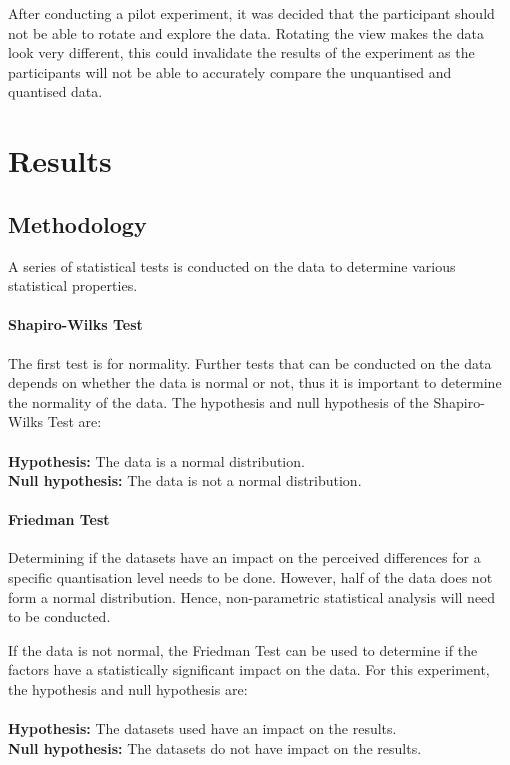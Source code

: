 After conducting a pilot experiment, it was decided that the participant should
not be able to rotate and explore the data. Rotating the view makes the data
look very different, this could invalidate the results of the experiment as the
participants will not be able to accurately compare the unquantised and
quantised data.



\section{Results}
\label{sec:experiment_results}

\subsection{Methodology}
\label{sub:experiment_methodology}

A series of statistical tests is conducted on the data to determine various
statistical properties.

\paragraph{Shapiro-Wilks Test}
The first test is for normality. Further tests that can be conducted on the
data depends on whether the data is normal or not, thus it is important to
determine the normality of the data. The hypothesis and null hypothesis of the
Shapiro-Wilks Test are: \\ \\
\textbf{Hypothesis:} The data is a normal distribution. \\
\textbf{Null hypothesis:} The data is not a normal distribution.

\paragraph{Friedman Test}
Determining if the datasets have an impact on the perceived differences for a
specific quantisation level needs to be done. However, half of the data does
not form a normal distribution. Hence, non-parametric statistical analysis will
need to be conducted.

If the data is not normal, the Friedman Test can be used to determine if the
factors have a statistically significant impact on the data. For this
experiment, the hypothesis and null hypothesis are: \\ \\
\textbf{Hypothesis:} The datasets used have an impact on the results. \\
\textbf{Null hypothesis:} The datasets do not have impact on the results.


